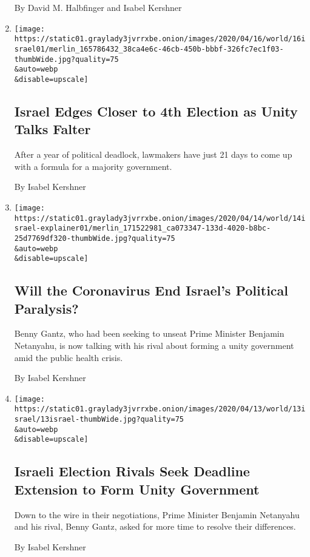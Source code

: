 \begin{enumerate}
  By David M. Halbfinger and Isabel Kershner
\item
  \href{/2020/04/16/world/middleeast/israel-election-gantz-netanyahu.html}{}

  \texttt{[image: https://static01.graylady3jvrrxbe.onion/images/2020/04/16/world/16israel01/merlin\_165786432\_38ca4e6c-46cb-450b-bbbf-326fc7ec1f03-thumbWide.jpg?quality=75\\\&auto=webp\\\&disable=upscale]}

  \hypertarget{israel-edges-closer-to-4th-election-as-unity-talks-falter}{%
  \subsection{Israel Edges Closer to 4th Election as Unity Talks
  Falter}\label{israel-edges-closer-to-4th-election-as-unity-talks-falter}}

  After a year of political deadlock, lawmakers have just 21 days to
  come up with a formula for a majority government.

  By Isabel Kershner
\item
  \href{/2020/04/14/world/middleeast/israel-coronavirus-netanyahu-gantz.html}{}

  \texttt{[image: https://static01.graylady3jvrrxbe.onion/images/2020/04/14/world/14israel-explainer01/merlin\_171522981\_ca073347-133d-4020-b8bc-25d7769df320-thumbWide.jpg?quality=75\\\&auto=webp\\\&disable=upscale]}

  \hypertarget{will-the-coronavirus-end-israels-political-paralysis}{%
  \subsection{Will the Coronavirus End Israel's Political
  Paralysis?}\label{will-the-coronavirus-end-israels-political-paralysis}}

  Benny Gantz, who had been seeking to unseat Prime Minister Benjamin
  Netanyahu, is now talking with his rival about forming a unity
  government amid the public health crisis.

  By Isabel Kershner
\item
  \href{/2020/04/13/world/middleeast/israel-election-netanyahu-gantz.html}{}

  \texttt{[image: https://static01.graylady3jvrrxbe.onion/images/2020/04/13/world/13israel/13israel-thumbWide.jpg?quality=75\\\&auto=webp\\\&disable=upscale]}

  \hypertarget{israeli-election-rivals-seek-deadline-extension-to-form-unity-government}{%
  \subsection{Israeli Election Rivals Seek Deadline Extension to Form
  Unity
  Government}\label{israeli-election-rivals-seek-deadline-extension-to-form-unity-government}}

  Down to the wire in their negotiations, Prime Minister Benjamin
  Netanyahu and his rival, Benny Gantz, asked for more time to resolve
  their differences.

  By Isabel Kershner
\end{enumerate}

